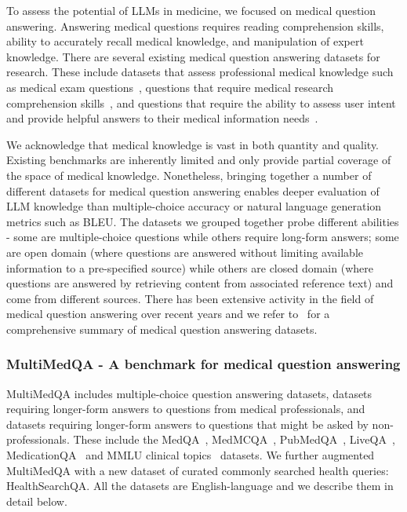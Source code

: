 To assess the potential of LLMs in medicine, we focused on medical question answering. Answering medical questions requires reading comprehension skills, ability to accurately recall medical knowledge, and manipulation of expert knowledge. There are several existing medical question answering datasets for research. These include datasets that assess professional medical knowledge such as medical exam questions~\cite{jin2021disease, pal2022medmcqa}, questions that require medical research comprehension skills~\cite{jin2019pubmedqa}, and questions that require the ability to assess user intent and provide helpful answers to their medical information needs~\cite{abacha2017overview, abacha2019bridging}. 

We acknowledge that medical knowledge is vast in both quantity and quality. Existing benchmarks are inherently limited and only provide partial coverage of the space of medical knowledge. Nonetheless, bringing together a number of different datasets for medical question answering enables deeper evaluation of LLM knowledge than multiple-choice accuracy or natural language generation metrics such as BLEU.  The datasets we grouped together probe different abilities - some are multiple-choice questions while others require long-form answers; some are open domain (where questions are answered without limiting available information to a pre-specified source) while others are closed domain (where questions are answered by retrieving content from associated reference text) and come from different sources. There has been extensive activity in the field of medical question answering over recent years and we refer to~\cite{jin2021disease} for a comprehensive summary of medical question answering datasets.

\subsubsection{MultiMedQA - A benchmark for medical question answering}

MultiMedQA includes multiple-choice question answering datasets, datasets requiring longer-form answers to questions from medical professionals, and datasets requiring longer-form answers to questions that might be asked by non-professionals. These include the MedQA~\cite{jin2021disease}, MedMCQA~\cite{pal2022medmcqa}, PubMedQA~\cite{jin2019pubmedqa}, LiveQA~\cite{abacha2017overview}, MedicationQA~\cite{abacha2019bridging} and MMLU clinical topics~\cite{hendrycks2020measuring} datasets. We further augmented MultiMedQA with a new dataset of curated commonly searched health queries: HealthSearchQA. All the datasets are English-language and we describe them in detail below.

